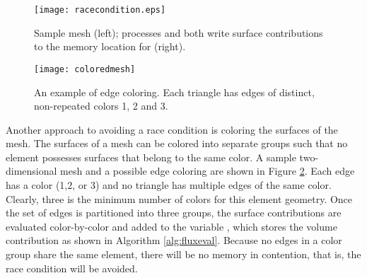 \documentclass[12pt]{article}
\begin{document}
\begin{figure}
	\centering
	\texttt{[image: racecondition.eps]}
	\caption{Sample mesh (left); processes  and  both write surface contributions to the memory location for  (right).}
	\label{fig:racecondition}
\end{figure}

\begin{figure}
	\centering
	\texttt{[image: coloredmesh]}
	\caption{An example of edge coloring.  Each triangle has edges of distinct, non-repeated colors 1, 2 and 3.}
	\label{fig:mesh}
\end{figure}


Another approach to avoiding a race condition is coloring the surfaces of the mesh.  The surfaces of a mesh can be colored into separate groups such that no element possesses surfaces that belong to the same color.  A sample two-dimensional mesh and a possible edge coloring are shown in Figure \ref{fig:mesh}.  Each edge has a color (1,2, or 3) and no triangle has multiple edges of the same color.  Clearly, three is the minimum number of colors for this element geometry.  Once the set of edges is partitioned into three groups, the surface contributions are evaluated color-by-color and added to the variable , which stores the volume contribution as shown in Algorithm \ref{alg:fluxeval}.  
Because no edges in a color group share the same element, there will be no memory in contention, that is, the race condition will be avoided.
\end{document}
